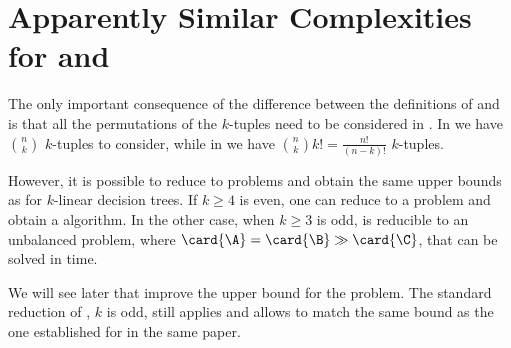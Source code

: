 \section{Apparently Similar Complexities for \kSUM and \kLDT}

The only important consequence of the difference between the definitions of
\kSUM and \kLDT is that all the permutations of the $k$-tuples need to be
considered in \kLDT. In \kSUM we have $\binom{n}{k}$ $k$-tuples to consider,
while in \kLDT we have $\binom{n}{k} k! = \frac{n!}{(n-k)!}$ $k$-tuples.

However, it is possible to reduce \kLDT to \kSUM problems and obtain the same
upper bounds as \kSUM for $k$-linear decision trees. If $k \ge 4$ is even, one
can reduce \kLDT to a \twoSUM problem and obtain a  algorithm. In the other case, when $k \ge 3$ is odd, \kLDT is reducible to
an unbalanced \threeSUM problem, where $\card{\A} = \card{\B} \gg \card{\C}$,
that can be solved in  time.

We will see later that \citet*{gronlund:2014} improve the upper bound for the
\threeSUM problem. The standard reduction of \kLDT, $k$ is odd, still applies
and allows to match the same 
bound as the one established for \threeSUM in the same paper.

